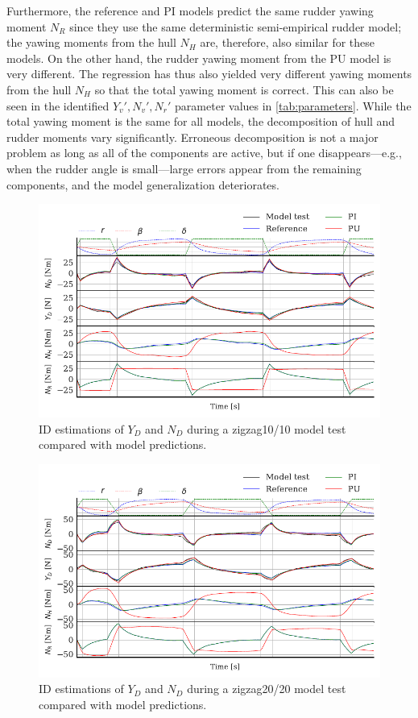 Furthermore, the reference and PI models predict the same rudder yawing moment $N_R$ since they use the same deterministic semi-empirical rudder model; the yawing moments from the hull $N_H$ are, therefore, also similar for these models. On the other hand, the rudder yawing moment from the PU model is very different. The regression has thus also yielded very different yawing moments from the hull $N_H$ so that the total yawing moment is correct. This can also be seen in the identified ${Y_v}',{N_v}',{N_r}'$ parameter values in \autoref{tab:parameters}. 
While the total yawing moment is the same for all models, the decomposition of hull and rudder moments vary significantly. Erroneous decomposition is not a major problem as long as all of the components are active, but if one disappears---e.g., when the rudder angle is small---large errors appear from the remaining components, and the model generalization deteriorates.  
\begin{figure}[h]
    \centering
    \includegraphics{figures/results.ID_zigzag10.pdf}
    \caption{ID estimations of $Y_D$ and $N_D$ during a zigzag10/10 model test compared with model predictions.}
    \label{fig:ID_zigzag10}
\end{figure}
\begin{figure}[h]
    \centering
    \includegraphics{figures/results.ID_zigzag20.pdf}
    \caption{ID estimations of $Y_D$ and $N_D$ during a zigzag20/20 model test compared with model predictions.}
    \label{fig:ID_zigzag20}
\end{figure}
\FloatBarrier

